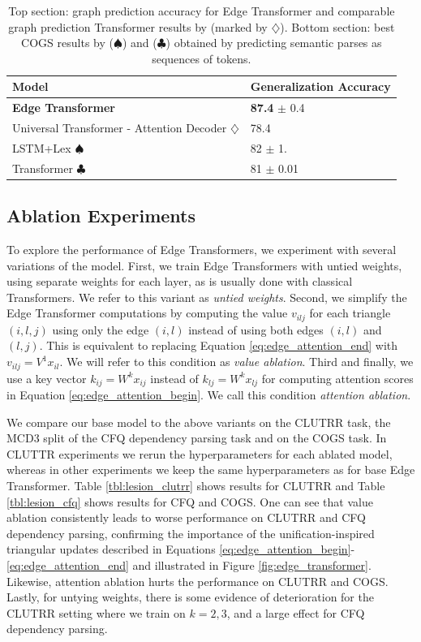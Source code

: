 \documentclass{article}
\begin{document}
\begin{table}[] 
\small
\centering
\caption{Top section: graph prediction accuracy for Edge Transformer
  and comparable graph prediction Transformer results by
  \citet{ontanon2021making} (marked by $\diamondsuit$). Bottom
  section: best COGS results by \citet{akyurek_learning_2021}
  ($\spadesuit$) and \citet{csordas_devil_2021} ($\clubsuit$) obtained
  by predicting semantic parses as sequences of tokens.}
\label{table:cogs}
\begin{tabular}{ll}
\toprule
Model            & Generalization Accuracy        
                 \\
\midrule
\textbf{Edge Transformer}      & \textbf{87.4} $\pm$ 0.4    \\    
Universal Transformer - Attention Decoder $\diamondsuit$ & 78.4          \\
\hline\hline
LSTM+Lex $\spadesuit$ & 82 $\pm$ 1. \\
Transformer $\clubsuit$ & 81 $\pm$ 0.01 \\
\bottomrule
\end{tabular}
\end{table}


\subsection{Ablation Experiments}

To explore the performance of Edge Transformers, we experiment with
several variations of the model. First, we train Edge Transformers
with untied weights, using separate weights for each layer, as is
usually done with classical Transformers. We refer to this variant as
\textit{untied weights}.  Second, we simplify the Edge Transformer
computations by computing the value $v_{ilj}$ for each triangle
$(i, l, j)$ using only the edge $(i, l)$ instead of using both edges
$(i, l)$ and $(l, j)$.  This is equivalent to replacing Equation
\ref{eq:edge_attention_end} with $v_{ilj} = V^1 x_{il}$. We will refer
to this condition as \textit{value ablation}. Third and finally, we use
a key vector $k_{ij} = W^k x_{ij}$ instead of $k_{lj} = W^k x_{lj}$
for computing attention scores in Equation
\ref{eq:edge_attention_begin}. We call this condition \textit{attention ablation}.

We compare our base model to the above variants on the CLUTRR task, 
the MCD3 split of the CFQ dependency parsing task and on the COGS task. In CLUTTR experiments we rerun the hyperparameters for each
ablated model, whereas in other experiments we keep the same
hyperparameters as for base Edge Transformer. Table \ref{tbl:lesion_clutrr} shows results for CLUTRR and Table 
\ref{tbl:lesion_cfq} shows results for CFQ and COGS. One can see that value ablation consistently
leads to worse performance on CLUTRR and CFQ dependency parsing, confirming the importance of the
unification-inspired triangular updates described in Equations
\ref{eq:edge_attention_begin}-\ref{eq:edge_attention_end} and
illustrated in Figure \ref{fig:edge_transformer}. Likewise, attention ablation hurts the performance on CLUTRR and COGS.
Lastly, for untying weights,
there is some evidence of deterioration for the CLUTRR setting where
we train on $k=2,3$, and a large effect for CFQ dependency parsing.
\end{document}
